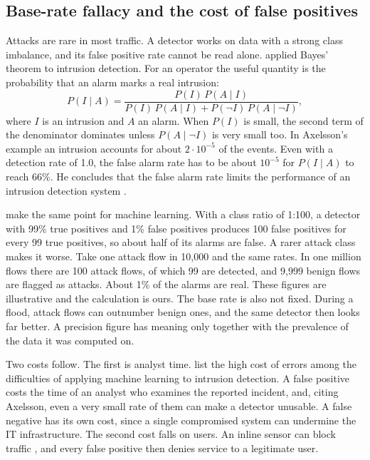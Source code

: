 \subsection{Base-rate fallacy and the cost of false positives}
\label{sec:base-rate-false-positives}

Attacks are rare in most traffic. A detector works on data with a strong
class imbalance, and its false positive rate cannot be read alone.
\citet{axelsson2000baserate} applied Bayes' theorem to intrusion detection.
For an operator the useful quantity is the probability that an alarm marks a
real intrusion:
\[
P(I \mid A) = \frac{P(I)\,P(A \mid I)}
  {P(I)\,P(A \mid I) + P(\neg I)\,P(A \mid \neg I)},
\]
where $I$ is an intrusion and $A$ an alarm. When $P(I)$ is small, the second
term of the denominator dominates unless $P(A \mid \neg I)$ is very small
too. In Axelsson's example an intrusion accounts for about $2 \cdot 10^{-5}$
of the events. Even with a detection rate of 1.0, the false alarm rate has to
be about $10^{-5}$ for $P(I \mid A)$ to reach 66\%. He concludes that the
false alarm rate limits the performance of an intrusion detection system
\citep{axelsson2000baserate}.

\citet{arp2022dosdonts} make the same point for machine learning. With a
class ratio of 1:100, a detector with 99\% true positives and 1\% false
positives produces 100 false positives for every 99 true positives, so about
half of its alarms are false. A rarer attack class makes it worse. Take one
attack flow in 10{,}000 and the same rates. In one million flows there are
100 attack flows, of which 99 are detected, and 9{,}999 benign flows are
flagged as attacks. About 1\% of the alarms are real. These figures are
illustrative and the calculation is ours. The base rate is also not fixed.
During a flood, attack flows can outnumber benign ones, and the same
detector then looks far better. A precision figure has meaning only together
with the prevalence of the data it was computed on.

Two costs follow. The first is analyst time. \citet{sommer2010outside} list
the high cost of errors among the difficulties of applying machine learning
to intrusion detection. A false positive costs the time of an analyst who
examines the reported incident, and, citing Axelsson, even a very small rate
of them can make a detector unusable. A false negative has its own cost,
since a single compromised system can undermine the IT infrastructure. The
second cost falls on users. An inline sensor can block traffic
\citep{scarfone2007nist80094}, and every false positive then denies service
to a legitimate user.

